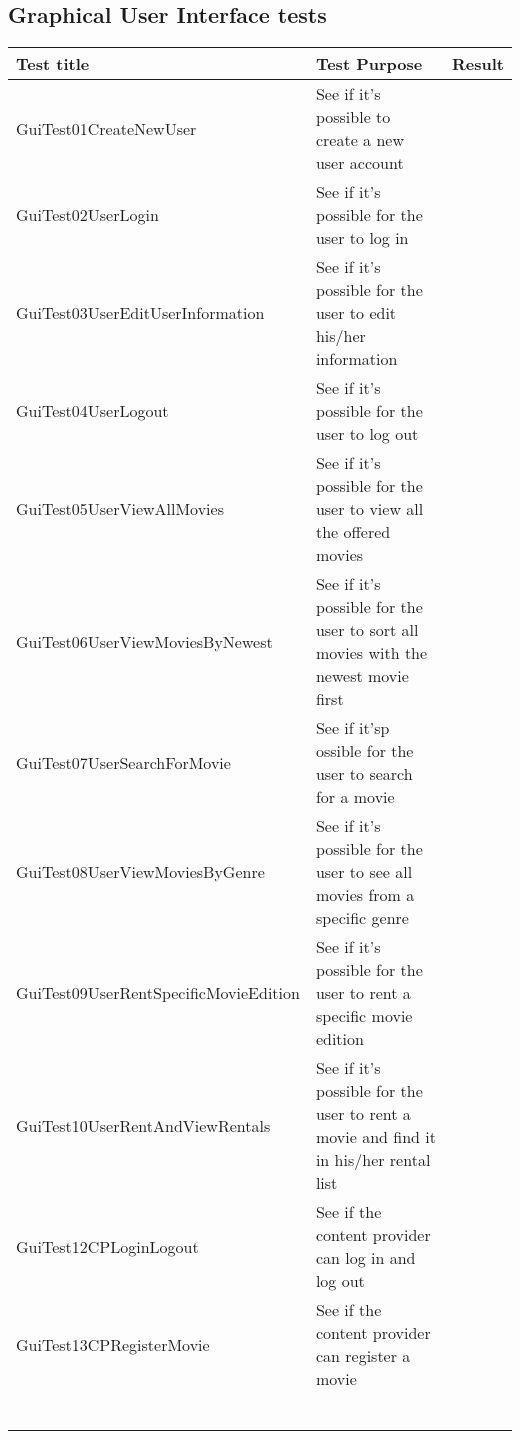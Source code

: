 \subsection{Graphical User Interface tests}
\label{Appendix_Test_Table_GUI}
\begin{centering}
\begin{longtable}{| p{5 cm} | p{7 cm} | c |}
\hline
Test title & Test Purpose & Result\\
\hline
GuiTest01CreateNewUser & See if it's possible to create a new user account & \\
\hline
GuiTest02UserLogin & See if it's possible for the user to log in & \\
\hline
GuiTest03UserEditUserInformation & See if it's possible for the user to edit his/her information & \\
\hline
GuiTest04UserLogout & See if it's possible for the user to log out & \\
\hline
GuiTest05UserViewAllMovies & See if it's possible for the user to view all the offered movies & \\
\hline
GuiTest06UserViewMoviesByNewest & See if it's possible for the user to sort all movies with the newest movie first & \\
\hline
GuiTest07UserSearchForMovie & See if it'sp ossible for the user to search for a movie & \\
\hline
GuiTest08UserViewMoviesByGenre & See if it's possible for the user to see all movies from a specific genre & \\
\hline
GuiTest09UserRentSpecificMovieEdition & See if it's possible for the user to rent a specific movie edition & \\
\hline
GuiTest10UserRentAndViewRentals & See if it's possible for the user to rent a movie and find it in his/her rental list & \\
\hline
GuiTest12CPLoginLogout & See if the content provider can log in and log out & \\
\hline
GuiTest13CPRegisterMovie & See if the content provider can register a movie & \\
\hline
 & & \\
\hline
 & & \\
\hline
 & & \\
\hline
 & & \\
\hline
 & & \\
\hline
 & & \\
\hline
\end{longtable}
\end{centering}
